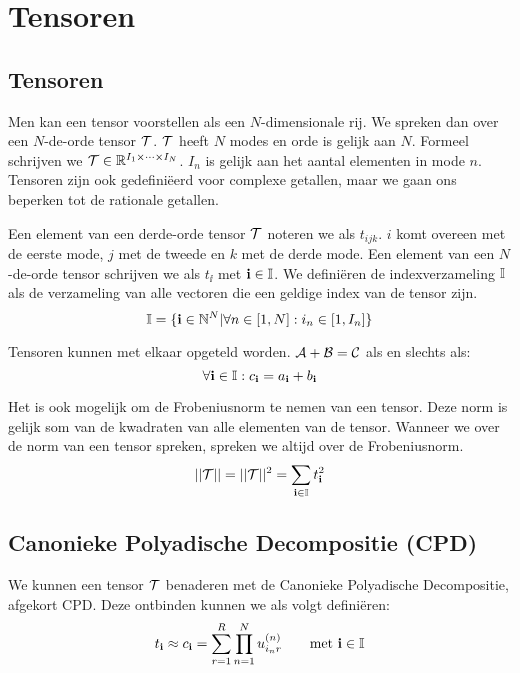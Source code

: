 \chapter{Tensoren}
\label{h:tensoren}


\section{Tensoren}
Men kan een tensor voorstellen als een $N$-dimensionale rij. We spreken dan over een $N$-de-orde tensor $\mathcal{T}$. $\mathcal{T}$ heeft $N$ modes en orde is gelijk aan $N$. Formeel schrijven we $\mathcal{T} \in \mathbb{R}^{I_1 \times \dotsb \times I_N}$. $I_n$ is gelijk aan het aantal elementen in mode $n$. Tensoren zijn ook gedefini\"eerd voor complexe getallen, maar we gaan ons beperken tot de rationale getallen.


Een element van een derde-orde tensor $\mathcal{T}$ noteren we als $t_{ijk}$. $i$ komt overeen met de eerste mode, $j$ met de tweede en $k$ met de derde mode. Een element van een $N$-de-orde tensor schrijven we als $t_\ii$ met $\textbf{i} \in \mathbb{I}$. We defini\"eren de indexverzameling $\mathbb{I}$ als de verzameling van alle vectoren die een geldige index van de tensor zijn.
\[
    \mathbb{I} = \{\textbf{i} \in \mathbb{N}^N | \forall n \in [1, N]: i_n \in [1, I_n]\}
\]


Tensoren kunnen met elkaar opgeteld worden. $\mathcal{A} + \mathcal{B} = \mathcal{C}$ als en slechts als:
\[
	\forall \textbf{i} \in \mathbb{I}: c_{\textbf{i}} = a_{\textbf{i}} + b_{\textbf{i}}
\]

Het is ook mogelijk om de Frobeniusnorm te nemen van een tensor. Deze norm is gelijk som van de kwadraten van alle elementen van de tensor. Wanneer we over de norm van een tensor spreken, spreken we altijd over de Frobeniusnorm.
\[
    ||\mathcal{T}|| = ||\mathcal{T}||^2 = \sum_{\textbf{i} \in \mathbb{I}} t_{\textbf{i}}^2
\]


\section{Canonieke Polyadische Decompositie (CPD)}
We kunnen een tensor $\mathcal{T}$ benaderen met de Canonieke Polyadische Decompositie, afgekort CPD. Deze ontbinden kunnen we als volgt defini\"eren:
\[
    t_{\textbf{i}} \approx c_{\textbf{i}} = \sum_{r=1}^{R} \prod_{n=1}^{N} u^{(n)}_{i_{n}r} \qquad \text{met $\textbf{i} \in \mathbb{I}$}
\]
